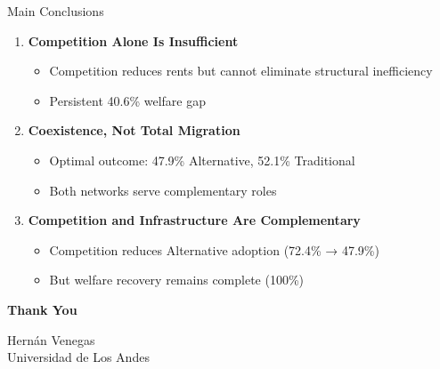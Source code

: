 \documentclass[aspectratio=169]{beamer}
\begin{document}
\begin{frame}{Main Conclusions}
    \begin{enumerate}
        \item \textbf{Competition Alone Is Insufficient}
        \begin{itemize}
            \item Competition reduces rents but cannot eliminate structural inefficiency
            \item Persistent 40.6\% welfare gap
        \end{itemize}
        
        \vspace{0.3cm}
        \item \textbf{Coexistence, Not Total Migration}
        \begin{itemize}
            \item Optimal outcome: 47.9\% Alternative, 52.1\% Traditional
            \item Both networks serve complementary roles
        \end{itemize}
        
        \vspace{0.3cm}
        \item \textbf{Competition and Infrastructure Are Complementary}
        \begin{itemize}
            \item Competition reduces Alternative adoption (72.4\% → 47.9\%)
            \item But welfare recovery remains complete (100\%)
        \end{itemize}
    \end{enumerate}
\end{frame}

\begin{frame}
    \centering
    \Huge \textbf{Thank You}
    
    \vspace{1cm}
    
    \vspace{0.5cm}
    \normalsize
    Hernán Venegas \\
    Universidad de Los Andes
    
\end{frame}
\end{document}
